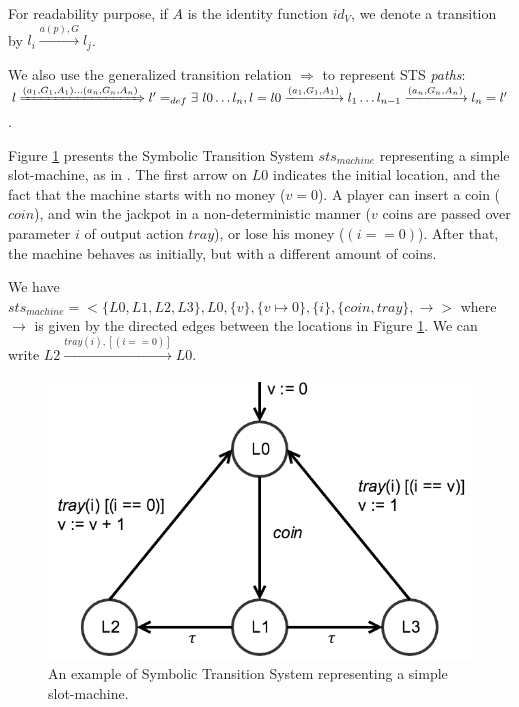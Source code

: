 For readability purpose, if $A$ is the identity function $id_V$,
we denote a transition by $l_i \xrightarrow{a(p),G} l_j$.

We also use the generalized transition relation $\Rightarrow$ to
represent STS \emph{paths}:\\ $l \xRightarrow{(a_1,G_1,A_1) \dots
(a_n,G_n,A_n)} l' =_{def} \exists ~l0 \dots l_n, l=l0
\xrightarrow{(a_1,G_1,A_1)} l_1 \dots
l_{n-1} \xrightarrow{(a_n,G_n,A_n)} l_n = l'$.

\begin{example}
    Figure \ref{fig:sts-example} presents the Symbolic Transition
    System $sts_{machine}$ representing a simple slot-machine, as
    in \cite{FTW05}. The first arrow on $L0$ indicates the
    initial location, and the fact that the machine starts with
    no money ($v = 0$). A player can insert a coin ($coin$), and
    win the jackpot in a non-deterministic manner ($v$ coins are
    passed over parameter $i$ of output action $tray$), or lose
    his money ($(i == 0)$). After that, the machine behaves as
    initially, but with a different amount of coins.

    We have $sts_{machine} = <\{L0, L1, L2, L3\}, L0, \{ v \}, \{
    v \mapsto 0 \}, \{ i \}, \{ coin, tray \}, \rightarrow >$
    where $\rightarrow$ is given by the directed edges between
    the locations in Figure \ref{fig:sts-example}.  We can write
    $L2 \xrightarrow{tray(i), [(i == 0)]} L0$.

    \begin{figure}[ht]
        \begin{center}
            \includegraphics[width=0.7\linewidth]{figures/sts-example.png}
        \end{center}

        \caption{An example of Symbolic Transition System
        representing a simple slot-machine.}
        \label{fig:sts-example}
    \end{figure}

    \label{example:sts}
\end{example}

